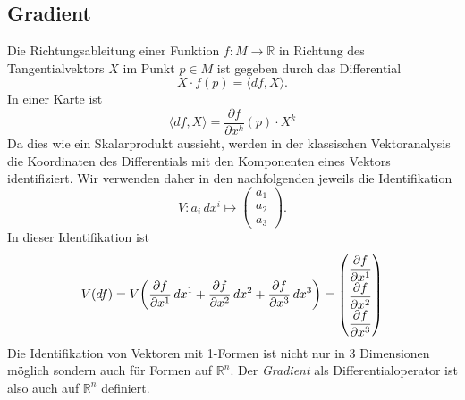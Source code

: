 \subsection{Gradient}
Die Richtungsableitung einer Funktion $f\colon M\to\mathbb{R}$ in 
%
Richtung des Tangentialvektors $X$ im Punkt $p\in M$ ist gegeben
durch das Differential
\[
X\cdot f(p) = \langle df, X\rangle.
\]
In einer Karte ist
\[
\langle df,X\rangle
=
\frac{\partial f}{\partial x^k}(p)
\cdot X^k
\]
Da dies wie ein Skalarprodukt aussieht, werden in der klassischen
Vektoranalysis die Koordinaten des Differentials mit den Komponenten
eines Vektors identifiziert.
Wir verwenden daher in den nachfolgenden jeweils die Identifikation
\[
V\colon
a_i\,dx^i \mapsto \begin{pmatrix} a_1\\a_2\\a_3\end{pmatrix}.
\]
In dieser Identifikation ist
\[
V(df)
=
V\biggl(
\frac{\partial f}{\partial x^1}\,dx^1
+
\frac{\partial f}{\partial x^2}\,dx^2
+
\frac{\partial f}{\partial x^3}\,dx^3
\biggr)
=
\renewcommand{\arraystretch}{1.8}
\begin{pmatrix}
\displaystyle\frac{\partial f}{\partial x^1}\\
\displaystyle\frac{\partial f}{\partial x^2}\\
\displaystyle\frac{\partial f}{\partial x^3}
\end{pmatrix}
\]
Die Identifikation von Vektoren mit 1-Formen ist nicht nur in 
3 Dimensionen möglich sondern auch für Formen auf $\mathbb{R}^n$.
Der {\em Gradient} als Differentialoperator ist also auch auf $\mathbb{R}^n$
%
definiert.

%
%

